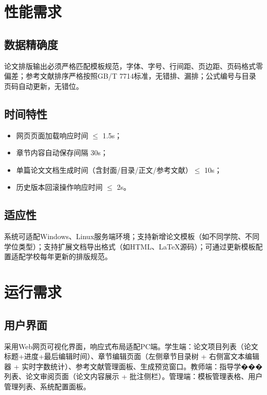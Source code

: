 \documentclass{../template/softeng}
\begin{document}


\section{性能需求}
\subsection{数据精确度}
论文排版输出必须严格匹配模板规范，字体、字号、行间距、页边距、页码格式零偏差；参考文献排序严格按照GB/T 7714标准，无错排、漏排；公式编号与目录页码自动更新，无错位。

\subsection{时间特性}
\begin{itemize}
    \item 网页页面加载响应时间 $\le$ 1.5s；
    \item 章节内容自动保存间隔 30s；
    \item 单篇论文文档生成时间（含封面/目录/正文/参考文献）$\le$ 10s；
    \item 历史版本回滚操作响应时间 $\le$ 2s。
\end{itemize}

\subsection{适应性}
系统可适配Windows、Linux服务端环境；支持新增论文模板（如不同学院、不同学位类型）；支持扩展文档导出格式（如HTML、LaTeX源码）；可通过更新模板配置适配学校每年更新的排版规范。

\section{运行需求}
\subsection{用户界面}
采用Web网页可视化界面，响应式布局适配PC端。学生端：论文项目列表（论文标题+进度+最后编辑时间）、章节编辑页面（左侧章节目录树 + 右侧富文本编辑器 + 实时字数统计）、参考文献管理面板、生成预览窗口。教师端：指导学���列表、论文审阅页面（论文内容展示 + 批注侧栏）。管理端：模板管理表格、用户管理列表、系统配置面板。
\end{document}

